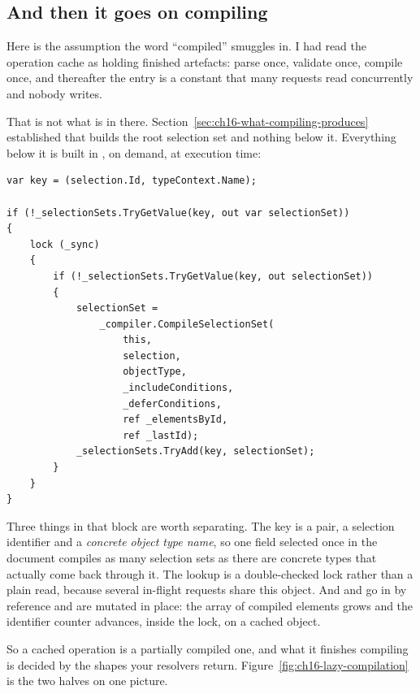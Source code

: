 \subsection*{And then it goes on compiling}

%
Here is the assumption the word \enquote{compiled} smuggles in. I had read the
operation cache as holding finished artefacts: parse once, validate once,
compile once, and thereafter the entry is a constant that many requests read
concurrently and nobody writes.

That is not what is in there. Section~\ref{sec:ch16-what-compiling-produces}
established that  builds the root selection set and nothing below
it. Everything below it is built in , on demand, at execution
time:

\begin{verbatim}
var key = (selection.Id, typeContext.Name);

if (!_selectionSets.TryGetValue(key, out var selectionSet))
{
    lock (_sync)
    {
        if (!_selectionSets.TryGetValue(key, out selectionSet))
        {
            selectionSet =
                _compiler.CompileSelectionSet(
                    this,
                    selection,
                    objectType,
                    _includeConditions,
                    _deferConditions,
                    ref _elementsById,
                    ref _lastId);
            _selectionSets.TryAdd(key, selectionSet);
        }
    }
}
\end{verbatim}

%
Three things in that block are worth separating. The key is a pair, a selection
identifier and a \emph{concrete object type name}, so one field selected once in
the document compiles as many selection sets as there are concrete types that
actually come back through it. The lookup is a double-checked lock rather than a
plain read, because several in-flight requests share this object. And
 and  go in by reference and are mutated in
place: the array of compiled elements grows and the identifier counter advances,
inside the lock, on a cached object.

So a cached operation is a partially compiled one, and what it finishes
compiling is decided by the shapes your resolvers return.
Figure~\ref{fig:ch16-lazy-compilation} is the two halves on one picture.

